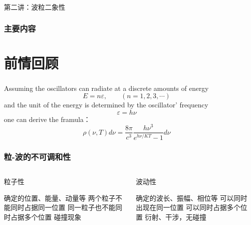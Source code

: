 \begin{frame} [plain]
    \frametitle{}
    \Background[1] 
    \begin{center}
    { {\huge 第二讲：波粒二象性}}
    \end{center} 
    \addtocounter{framenumber}{-1}     
\end{frame}

\begin{frame}
    \frametitle{主要内容}
    \transfade
    \tableofcontents
    \addtocounter{framenumber}{-1} 
\end{frame}

\section{前情回顾}

\begin{frame}
    \frametitle{}
    \begin{tcolorbox3}[前情回顾]
        Assuming the oscillators can radiate at a discrete amounts of energy
        \[    E=n\varepsilon, \qquad (n=1,2,3,\cdots) \]
        and the unit of the energy is determined by the oscillator' frequency
        \[   \varepsilon=h\nu  \]
        one can derive the framula：
        \[ \rho(\nu, T) d \nu=\frac{8 \pi}{c^{3}} \frac{h \nu^{3} }{e^{h \nu / K T}-1} d \nu \]
    \end{tcolorbox3}
\end{frame}

\begin{frame}
    \frametitle{粒-波的不可调和性}
	\begin{columns}
		\begin{column}[t]{0.46\linewidth}
			粒子性
			\begin{itemize}
				\Item  确定的位置、能量、动量等
				\Item  两个粒子不能同时占据同一位置
				\Item  同一粒子也不能同时占据多个位置
				\Item  碰撞现象
			\end{itemize}
		\end{column}
		\begin{column}[t]{0.46\linewidth}
			波动性
			\vspace{1ex}
			\begin{itemize}
				\Item  确定的波长、振幅、相位等
				\Item  可以同时出现在同一位置
				\Item  可以同时占据多个位置
				\Item  衍射、干涉，无碰撞
			\end{itemize}
		\end{column}
	\end{columns}
\end{frame}

